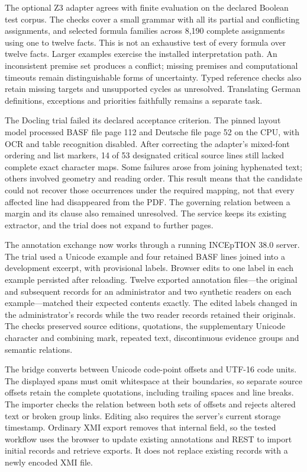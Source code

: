 \begingroup
{}
The optional Z3 adapter agrees with finite evaluation on the declared Boolean
test corpus. The checks cover a small grammar with all its partial and conflicting
assignments, and selected formula families across 8,190 complete assignments
using one to twelve facts. This is not an exhaustive test of every formula over
twelve facts. Larger examples exercise the installed interpretation path. An
inconsistent premise set produces a conflict; missing premises and computational
timeouts remain distinguishable forms of uncertainty. Typed reference checks
also retain missing targets and unsupported cycles as unresolved. Translating
German definitions, exceptions and priorities faithfully remains a separate task.
\par\endgroup

The Docling trial failed its declared acceptance criterion. The pinned layout
model processed BASF file page 112 and Deutsche file page 52 on the CPU, with
OCR and table recognition disabled. After correcting the adapter's mixed-font
ordering and list markers, 14 of 53 designated critical source lines still lacked
complete exact character maps. Some failures arose from joining hyphenated text;
others involved geometry and reading order. This result means that the candidate
could not recover those occurrences under the required mapping, not that every
affected line had disappeared from the PDF. The governing relation between a
margin and its clause also remained unresolved. The service keeps its existing
extractor, and the trial does not expand to further pages.

The annotation exchange now works through a running INCEpTION 38.0 server.
The trial used a Unicode example and four retained BASF lines joined into a
development excerpt, with provisional labels. Browser edits to one label in
each example persisted after reloading. Twelve exported annotation files---the
original and subsequent records for an administrator and two synthetic readers
on each example---matched their expected contents exactly. The edited labels
changed in the administrator's records while the two reader records retained
their originals. The checks preserved source editions, quotations, the
supplementary Unicode character and combining mark, repeated text,
discontinuous evidence groups and semantic relations.

The bridge converts between Unicode code-point offsets and UTF-16 code units.
The displayed spans must omit whitespace at their boundaries, so separate
source offsets retain the complete quotations, including trailing spaces and
line breaks.
The importer checks the relation between both sets of offsets and rejects
altered text or broken group links. Editing also requires the server's current
storage timestamp. Ordinary XMI export removes that internal field, so the
tested workflow uses the browser to update existing annotations and REST to
import initial records and retrieve exports. It does not replace existing
records with a newly encoded XMI file.

